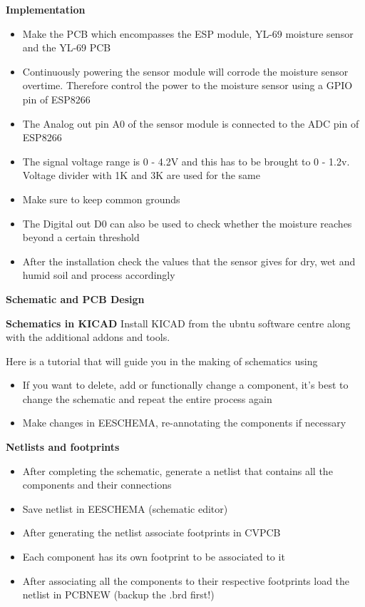 \documentclass[16pt]{article}
\begin{document}
{\Large{\textbf{Implementation}}}

\begin{itemize}

\item
  Make the PCB which encompasses the ESP module, YL-69 moisture sensor
  and the YL-69 PCB
\item
  Continuously powering the sensor module will corrode the moisture
  sensor overtime. Therefore control the power to the moisture sensor
  using a GPIO pin of ESP8266
\item
  The Analog out pin A0 of the sensor module is connected to the ADC pin
  of ESP8266
\item
  The signal voltage range is 0 - 4.2V and this has to be brought to 0 -
  1.2v. Voltage divider with 1K and 3K are used for the same
\item
  Make sure to keep common grounds
\item
  The Digital out D0 can also be used to check whether the moisture
  reaches beyond a certain threshold
\item
  After the installation check the values that the sensor gives for dry,
  wet and humid soil and process accordingly
\end{itemize}


{\LARGE{\textbf{Schematic and PCB
Design}}}

{\Large{\textbf{Schematics in KICAD}}}
Install KICAD from the ubntu software centre along with the additional
addons and tools.

Here is a tutorial that will guide you in the making of schematics using

\begin{itemize}

\item
  If you want to delete, add or functionally change a component, it's
  best to change the schematic and repeat the entire process again
\item
  Make changes in EESCHEMA, re-annotating the components if necessary
\end{itemize}

{\Large{\textbf{Netlists and
footprints}}}

\begin{itemize}

\item
  After completing the schematic, generate a netlist that contains all
  the components and their connections
\item
  Save netlist in EESCHEMA (schematic editor)
\item
  After generating the netlist associate footprints in CVPCB
\item
  Each component has its own footprint to be associated to it
\item
  After associating all the components to their respective footprints
  load the netlist in PCBNEW (backup the .brd first!)
\end{itemize}
\end{document}
